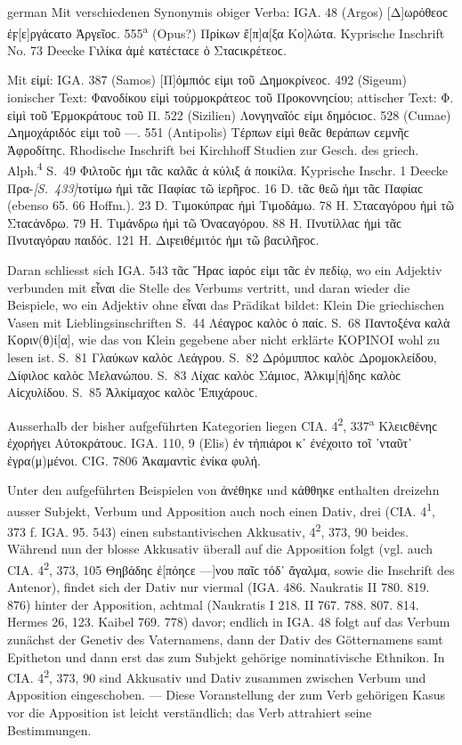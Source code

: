 \begin{otherlanguage*}{german}
Mit verschiedenen Synonymis obiger Verba: IGA. 48 (Argos) [Δ]ωρόθεοϲ ἐ\-ϝ[ε]ρ\-γά\-ϲα\-το Ἀργεῖοϲ. 555\textsuperscript{a} (Opus?) Πρίκων ἔ[π]α[ξα Κο]λώτα. Kyprische Inschrift No. 73 Deecke Γιλίκα ἁμὲ κατέϲταϲε ὁ Σταϲικρέτεοϲ.

Mit εἰμί: IGA. 387 (Samos) [Π]όμπιόϲ εἰμι τοῦ Δημοκρίνεοϲ. 492 (Sigeum) ionischer Text: Φανοδίκου εἰμὶ τοὐρμοκράτεοϲ τοῦ Προκοννηϲίου; attischer Text: Φ. εἰμὶ τοῦ Ἑρμοκράτουϲ τοῦ Π. 522 (Sizilien) Λονγηναῖόϲ εἰμι δημόϲιοϲ. 528 (Cumae) Δημοχάριδόϲ εἰμι τοῦ —. 551 (Antipolis) Τέρπων εἰμὶ θεᾶϲ θεράπων ϲε\-μνῆϲ Ἀφρο\-δίτηϲ. Rhodische Inschrift bei Kirchhoff Studien zur Gesch. des griech. Alph.\textsuperscript{4} S.~49 Φιλτοῦϲ ἠμι τᾶϲ καλᾶϲ ἁ κύλιξ ἁ ποικίλα. Kyprische Inschr. 1 Deecke Πρα-\hypertarget{p433}{\emph{[S.~433]}}\label{p433}τοτίμω ἠμὶ τᾶϲ Παφίαϲ τῶ ἰερῆϝοϲ. 16 D. tᾶϲ θεῶ ἠμι τᾶϲ Παφίαϲ (ebenso 65. 66 Hoffm.). 23 D. Τιμοκύπραϲ ἠμὶ Τιμοδάμω. 78 Η. Σταϲαγόρου ἠμὶ τῶ Σταϲάνδρω. 79 Η. Τιμάνδρω ἠμὶ τῶ Ὀναϲαγόρου. 88 Η. Πνυτίλλαϲ ἠμὶ τᾶϲ Πνυταγόραυ παιδόϲ. 121 Η. Διϝειθέμιτόϲ ἠμι τῶ βαϲιλῆϝοϲ.

Daran schliesst sich IGA. 543 τᾶϲ Ἥραϲ ἱαρόϲ εἰμι τᾶϲ ἐν πεδίῳ, wo ein Adjektiv verbunden mit εἶναι die Stelle des Verbums vertritt, und daran wieder die Beispiele, wo ein Adjektiv ohne εἶναι das Prädikat bildet: Klein Die griechischen Vasen mit Lieblingsinschriften S.~44 Λέαγροϲ καλὸϲ ὁ παίϲ. S.~68 Παντοξένα καλὰ Κοριν(θ)ί[α], wie das von Klein gegebene aber nicht erklärte ΚΟΡΙΝΟΙ wohl zu lesen ist. S.~81 Γλαύκων καλὸϲ Λεάγρου. S.~82 Δρόμιπποϲ καλὸϲ Δρομοκλείδου, Δίφιλοϲ καλὸϲ Μελανώπου. S.~83 Λίχαϲ καλὸϲ Σάμιοϲ, Ἀλκιμ[ή]δηϲ καλὸϲ Αἰϲχυ\-λίδου. S.~85 Ἀλ\-κί\-μα\-χοϲ καλὸϲ Ἐπιχάρουϲ.

Ausserhalb der bisher aufgeführten Kategorien liegen CIA. 4\textsuperscript{2}, 337\textsuperscript{a} Κλειϲθέ\-νηϲ ἐχορήγει Αὐτοκράτουϲ. IGA. 110, 9 (Elis) ἐν τἠπιάροι κ᾽ ἐνέχοιτο τοῖ ᾽νταῦτ᾽ ἐγρα(μ)μένοι. CIG. 7806 Ἀκαμαντὶϲ ἐνίκα φυλή.

Unter den aufgeführten Beispielen von ἀνέθηκε und κάθθηκε enthalten dreizehn ausser Subjekt, Verbum und Apposition auch noch einen Dativ, drei (CIA. 4\textsuperscript{1}, 373 f. IGA. 95. 543) einen substantivischen Akkusativ, 4\textsuperscript{2}, 373, 90 beides. Während nun der blosse Akkusativ überall auf die Apposition folgt (vgl. auch CIA. 4\textsuperscript{2}, 373, 105 Θηβάδηϲ ἐ[πόηϲε —]νου παῖϲ τόδ᾽ ἄγαλμα, sowie die Inschrift des Antenor), findet sich der Dativ nur viermal (IGA. 486. Naukratis II 780. 819. 876) hinter der Apposition, achtmal (Naukratis I 218. II 767. 788. 807. 814. Hermes 26, 123. Kaibel 769. 778) davor; endlich in IGA. 48 folgt auf das Verbum zunächst der Genetiv des Vaternamens, dann der Dativ des Götternamens samt Epitheton und dann erst das zum Subjekt gehörige nominativische Ethnikon. In CIA. 4\textsuperscript{2}, 373, 90 sind Akkusativ und Dativ zusammen zwischen Verbum und Apposition eingeschoben. — Diese Voranstellung der zum Verb gehörigen Kasus vor die Apposition ist leicht verständlich; das Verb attrahiert seine Bestimmungen.


\end{otherlanguage*}
